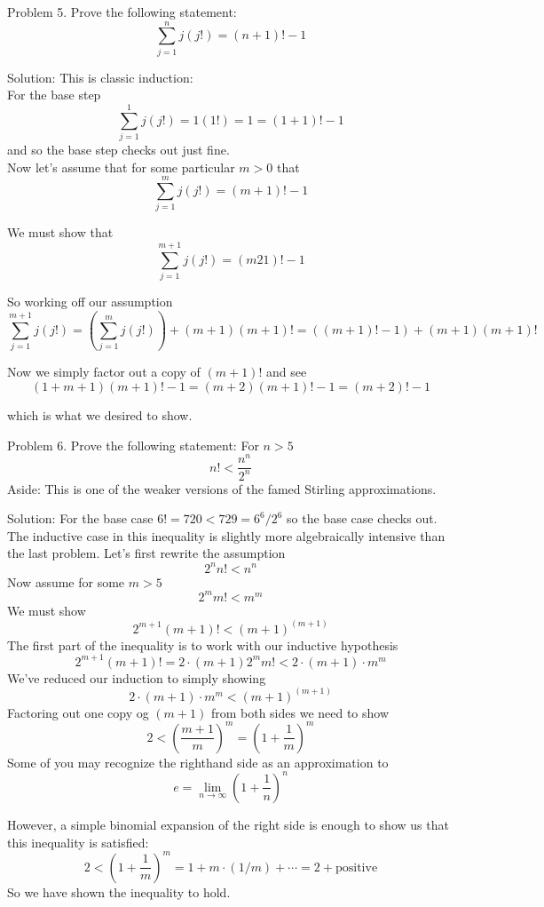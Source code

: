 \documentclass[16 pt]{amsart}
\theoremstyle{definition}
\theoremstyle{remark}
\numberwithin{equation}{subsection}
\begin{document}
\newpage 

Problem 5.
Prove the following statement:
\[
\sum_{j=1}^{n} j(j!) = (n+1)!-1
\]

\vspace{1in}

Solution:  This is classic induction:\\
For the base step
\[
\sum_{j=1}^{1} j(j!) = 1(1!) = 1 = (1+1)!-1
\]
and so the base step checks out just fine.\\

Now let's assume that for some particular $m>0$ that
\[
\sum_{j=1}^{m} j(j!) = (m+1)!-1
\]

We must show that
\[
\sum_{j=1}^{m+1} j(j!) = (m21)!-1
\]

So working off our assumption
\[
\sum_{j=1}^{m+1} j(j!) = \left(\sum_{j=1}^{m} j(j!)\right) + (m+1)(m+1)! = ((m+1)!-1) + (m+1)(m+1)!
\]

Now we simply factor out a copy of $(m+1)!$ and see
\[
(1+m+1)(m+1)! - 1 = (m+2)(m+1)! -1 = (m+2)! -1
\]

which is what we desired to show.



\newpage

Problem 6.
Prove the following statement: For $n>5$
\[
n! < \frac{n^n}{2^n}
\]
Aside: This is one of the weaker versions of the famed Stirling approximations.

\vspace{1in}

Solution: For the base case $6! = 720 < 729 = 6^6/2^6$ so the base case checks out.\\

The inductive case in this inequality is slightly more algebraically intensive than the last problem.  Let's first rewrite the assumption
\[
2^n n! < n^n
\]
Now assume for some $m>5$ 
\[
2^m m! < m^m
\]
We must show
\[
2^{m+1} (m+1)! < (m+1)^{(m+1)}
\]
The first part of the inequality is to work with our inductive hypothesis
\[
2^{m+1}(m+1)! = 2\cdot(m+1) 2^m m! < 2\cdot (m+1) \cdot m^m
\]
We've reduced our induction to simply showing
\[
2\cdot (m+1) \cdot m^m < (m+1)^{(m+1)}
\]
Factoring out one copy og $(m+1)$ from both sides we need to show
\[
2 < \left(\frac{m+1}{m}\right)^m = \left(1+\frac{1}{m}\right)^m
\]
Some of you may recognize the righthand side as an approximation to 
\[
e = \lim_{n\rightarrow \infty} \left(1+\frac{1}{n}\right)^n
\]

However, a simple binomial expansion of the right side is enough to show us that this inequality is satisfied:
\[
2 < \left(1+\frac{1}{m}\right)^m = 1 + m\cdot(1/m) + \cdots = 2 + \text{positive}
\]
So we have shown the inequality to hold.
\end{document}
